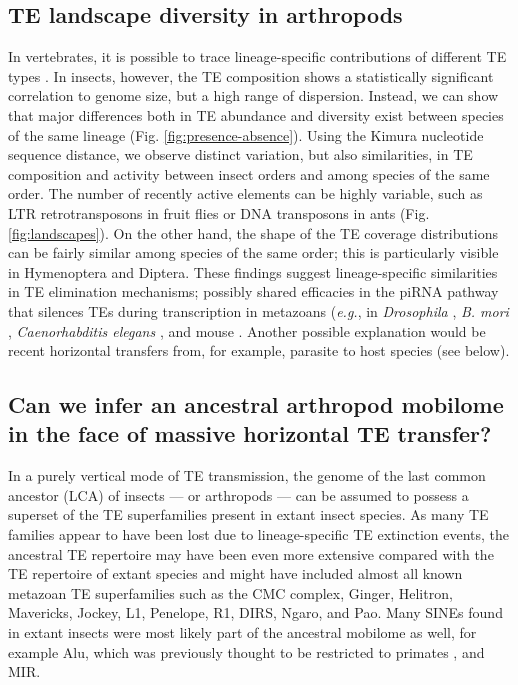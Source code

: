 \subsection{TE landscape diversity in arthropods}

In vertebrates, it is possible to trace lineage-specific contributions
of different TE types \citep{Chalopin2015}. In insects, however, the TE
composition shows a statistically significant correlation to genome
size, but a high range of dispersion. Instead, we can show that major
differences both in TE abundance and diversity exist between species of
the same lineage (Fig.  \ref{fig:presence-absence}). Using the Kimura
nucleotide sequence distance, we observe distinct variation, but also
similarities, in TE composition and activity between insect orders and
among species of the same order. The number of recently active elements
can be highly variable, such as LTR retrotransposons in fruit flies or
DNA transposons in ants (Fig.  \ref{fig:landscapes}). On the other hand,
the shape of the TE coverage distributions can be fairly similar among
species of the same order; this is particularly visible in Hymenoptera
and Diptera. These findings suggest lineage-specific similarities in TE
elimination mechanisms; possibly shared efficacies in the piRNA pathway
that silences TEs during transcription in metazoans (\emph{e.g.}, in
\emph{Drosophila} \citep{LeThomas2013,Yamashiro2017}, \emph{B. mori}
\citep{Matsumoto2016}, \emph{Caenorhabditis elegans} \citep{Zhang2018},
and mouse \citep{Toth2016}.  Another possible explanation would be
recent horizontal transfers from, for example, parasite to host species
(see below).

\subsection{Can we infer an ancestral arthropod mobilome in the face of
massive horizontal TE transfer?}

In a purely vertical mode of TE transmission, the genome of the last
common ancestor (LCA) of insects --- or arthropods --- can be assumed to
possess a superset of the TE superfamilies present in extant insect
species. As many TE families appear to have been lost due to
lineage-specific TE extinction events, the ancestral TE repertoire may
have been even more extensive compared with the TE repertoire of extant
species and might have included almost all known metazoan TE
superfamilies such as the CMC complex, Ginger, Helitron, Mavericks,
Jockey, L1, Penelope, R1, DIRS, Ngaro, and Pao. Many SINEs found in
extant insects were most likely part of the ancestral mobilome as well,
for example Alu, which was previously thought to be restricted to
	primates \citep{Deininger2011}, and MIR.

